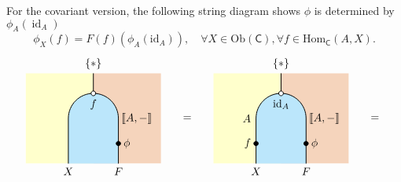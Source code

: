 \noindent For the covariant version, the following string diagram shows $\phi$ is determined by $\phi_A\left(\operatorname{id}_A\right)$
\[
        \phi_X(f)=F(f)(\phi_A(\mathrm{id}_A)),\quad\forall X\in \mathrm{Ob}(\mathsf{C}),\forall f\in \mathrm{Hom}_{\mathsf{C}}(A,X).
\]
\[
    \begin{tikzpicture}[x=0.8cm,y=0.8cm, line width=0.7pt, hollow/.style={
            circle,
            fill=white,
            draw,
            outer sep=0pt,
            inner sep=1.5pt,
            line width=0.7pt
          }]
         \definecolor{leftcolor}{RGB}{255,255,204}
    \definecolor{midcolor}{HTML}{BBE6FB}
    \definecolor{rightcolor}{HTML}{F5D4BC}

    \node at (-3.75, 1.8) {$=$};
    \node at (3.75, 1.8) {$=$};

    \begin{scope}[shift={(-7.5,0)}]
        \begin{scope} 
            \clip (-2.7,0) rectangle (2.7, 3.6);     
            \fill[fill=leftcolor] (-3,0) rectangle (0, 4);  
            \fill[fill=rightcolor] (0,0) rectangle (3, 4);  
            \draw[fill=midcolor, rounded corners=0.8cm, line width=0.7pt] (-1, -2) rectangle (1, 2.8);
        \end{scope}
        \draw (0, 3.6) -- (0,2.8);
        \filldraw [black] (1,0.8) circle (2pt) node[right=1pt] {$\phi$};
        \node[below] at (-1, 0) {$X$};
        \node[right=-1pt] at (1, 1.8) {$\llbracket A , -\rrbracket$};
        \node[below] at (1, 0) {$F$};
        \node[hollow] at (0, 2.8) {};
        \node[below=2pt] at (0, 2.8) {$f$}; 
        \node[above] at (0, 3.6) {$\{*\}$};
    \end{scope}

    \begin{scope}[shift={(0,0)}]
        \begin{scope} 
            \clip (-2.7,0) rectangle (2.7, 3.6);     
            \fill[fill=leftcolor] (-3,0) rectangle (0, 4);  
            \fill[fill=rightcolor] (0,0) rectangle (3, 4);  
            \draw[fill=midcolor, rounded corners=0.8cm, line width=0.7pt] (-1, -2) rectangle (1, 2.8);
        \end{scope}
        \draw (0, 3.6) -- (0,2.8);
        \filldraw [black] (1,0.8) circle (2pt) node[right=1pt] {$\phi$};
        \filldraw [black] (-1,0.8) circle (2pt) node[left=1pt] {$f$};
        \node[below] at (-1, 0) {$X$};
        \node[right=-1pt] at (1, 1.8) {$\llbracket A , -\rrbracket$};
        \node[left=1pt] at (-1, 1.8) {$A$};
        \node[below] at (1, 0) {$F$};
        \node[hollow] at (0, 2.8) {};
        \node[below=2pt] at (0, 2.8) {$\mathrm{id}_A$}; 
        \node[above] at (0, 3.6) {$\{*\}$};
    \end{scope}


\end{tikzpicture}\]
